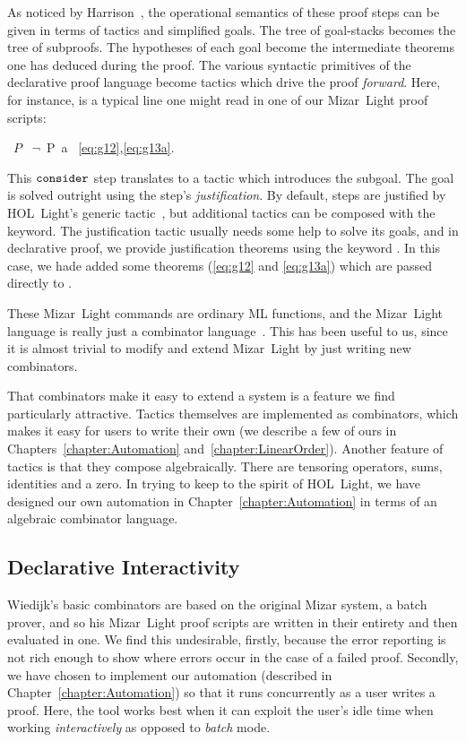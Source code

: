 As noticed by Harrison~\cite{MizarHOL}, the operational semantics of these proof steps can be given in terms of tactics and simplified goals. The tree of goal-stacks becomes the tree of subproofs. The hypotheses of each goal become the intermediate theorems one has deduced during the proof. The various syntactic primitives of the declarative proof language become tactics which drive the proof \emph{forward}. Here, for instance, is a typical line one might read in one of our Mizar~Light proof scripts:
\begin{center}
\ $P$ \ $\neg$\ P\ a \ \eqref{eq:g12},\eqref{eq:g13a}.
\end{center}
This $\texttt{consider}$ step translates to a tactic which introduces the subgoal\linebreak {}. The goal is solved outright using the step's \emph{justification}. By default, steps are justified by HOL~Light's generic  tactic~\cite{HarrisonMESON}, but additional tactics can be composed with the  keyword. The justification tactic usually needs some help to solve its goals, and in declarative proof, we provide justification theorems using the keyword . In this case, we hade added some theorems (\ref{eq:g12} and \ref{eq:g13a}) which are passed directly to .

These Mizar~Light commands are ordinary ML functions, and the Mizar~Light language is really just a combinator language~\cite{CombinatorLanguages}. This has been useful to us, since it is almost trivial to modify and extend Mizar~Light by just writing new combinators. 

That combinators make it easy to extend a system is a feature we find particularly attractive. Tactics themselves are implemented as combinators, which makes it easy for users to write their own (we describe a few of ours in Chapters~\ref{chapter:Automation} and~\ref{chapter:LinearOrder}). Another feature of tactics is that they compose algebraically. There are tensoring operators, sums, identities and a zero. In trying to keep to the spirit of HOL~Light, we have designed our own automation in Chapter~\ref{chapter:Automation} in terms of an algebraic combinator language.

\subsection{Declarative Interactivity}\label{sec:MizarLightExtend}
Wiedijk's basic combinators are based on the original Mizar system, a batch prover, and so his Mizar~Light proof scripts are written in their entirety and then evaluated in one. We find this undesirable, firstly, because the error reporting is not rich enough to show where errors occur in the case of a failed proof. Secondly, we have chosen to implement our automation (described in Chapter~\ref{chapter:Automation}) so that it runs concurrently as a user writes a proof. Here, the tool works best when it can exploit the user's idle time when working \emph{interactively} as opposed to \emph{batch} mode.

